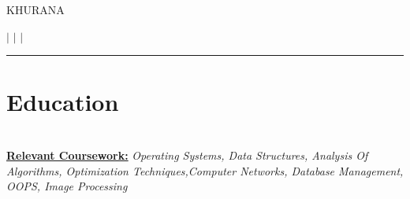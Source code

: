 \documentclass[]{deedy-resume-openfont}
\begin{document}
      
      
  
 {KHURANA}\\ \vspace{0pt}
   

    \large {}       $|$ \href{mailto:khurana.utkarsh30@gmail.com}{} $|$ 
    \href{http://linkedin.com/in/utkarshk30}{ } $|$
    \href{http://github.com/utkarshk30}{} 
    \href{http://utkarshk30.netlify.app}{} 
    
\par\noindent\rule{\textwidth}{0.2pt}




%
%
\section{{Education}}
\raggedright

    \hspace*{\fill}  \\
    \hspace*{\fill}
    {  {\newline{}\textbf { {\underline{Relevant Coursework:}}} \textit{Operating Systems, Data Structures, Analysis Of Algorithms, Optimization Techniques,\newline Computer Networks, Database Management, OOPS, Image Processing}}}
    
    
    \sectionsep
  

    \hspace*{\fill}  \\
    \hspace*{\fill}\
    
\end{document}
